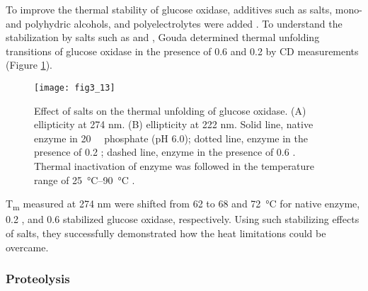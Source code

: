 \begin{refsection}
To improve the thermal stability of glucose oxidase, additives such as salts,
mono- and polyhydric alcohols, and polyelectrolytes were added
\cite{Appleton1997,Gouda2003}. To understand the stabilization by salts
such as  and , Gouda  determined thermal
unfolding transitions of glucose oxidase in the presence of \SI{0.6}{\Molar}
 and \SI{0.2}{\Molar}  by CD measurements \cite{Gouda2003}
(Figure \ref{fig:heat-inactivation-improve}). 
\begin{figure}[htbp] \centering \texttt{[image: fig3\_13]} 
    \caption[Effect of salts on the thermal unfolding of  glucose oxidase. (A)
    ellipticity at 274 nm. (B) ellipticity at 222 nm. Solid line, native enzyme
in \SI{20}{\milli\Molar} phosphate (pH 6.0); dotted line, enzyme in the
presence of \SI{0.2}{\Molar}  ; dashed line, enzyme in the presence
of \SI{0.6}{\Molar} . Thermal inactivation of enzyme was followed in
the temperature range of \SIrange{25}{90}{\celsius}.]{Effect of salts on the thermal
    unfolding of  glucose oxidase. (A) ellipticity at 274 nm. (B) ellipticity
    at 222 nm. Solid line, native enzyme in \SI{20}{\milli\Molar} phosphate (pH
    6.0); dotted line, enzyme in the presence of \SI{0.2}{\Molar}  ;
    dashed line, enzyme in the presence of \SI{0.6}{\Molar} . Thermal
    inactivation of enzyme was followed in the temperature range of
    \SIrange{25}{90}{\celsius} \cite{Gouda2003}.}
    \label{fig:heat-inactivation-improve} 
\end{figure}

T\textsubscript{m} measured at 274 nm were shifted from 62 to 68 and
\SI{72}{\celsius} for native enzyme, \SI{0.2}{\Molar} , and
\SI{0.6}{\Molar}  stabilized glucose oxidase, respectively. Using such
stabilizing effects of salts, they successfully demonstrated how the
heat limitations could be overcame. 

\subsubsection{Proteolysis}


\end{refsection}
